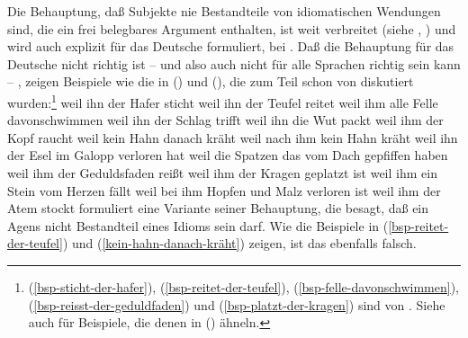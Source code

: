 Die Behauptung, daß Subjekte nie Bestandteile von idiomatischen Wendungen sind, die ein frei belegbares
Argument enthalten, ist weit verbreitet (siehe \zb {},
) und wird auch explizit für das Deutsche formuliert, \zb bei \citet[]{Grewendorf2002a}.
Daß die Behauptung für das Deutsche nicht richtig ist -- und also auch nicht für alle Sprachen richtig sein kann -- ,
zeigen Beispiele wie die in () und (), die zum Teil schon von \citet[]{Reis82} diskutiert
wurden:\footnote{
(\ref{bsp-sticht-der-hafer}), (\ref{bsp-reitet-der-teufel}), (\ref{bsp-felle-davonschwimmen}),
(\ref{bsp-reisst-der-geduldfaden}) und (\ref{bsp-platzt-der-kragen})
 sind von \citet[]{Reis82}. Siehe auch \citet[]{Haider93a} für Beispiele,
die denen in () ähneln.%
}
\eal
\ex\label{bsp-sticht-der-hafer}
weil ihn der Hafer sticht          %
\ex\label{bsp-reitet-der-teufel}
weil ihn der Teufel reitet         %
\ex\label{bsp-felle-davonschwimmen}
weil ihm alle Felle davonschwimmen %
\ex weil ihn der Schlag trifft     %
\ex\label{ex-ihn-die-wut-packt}
weil ihn die Wut packt         %
\ex weil ihm der Kopf raucht       %
\ex\label{kein-hahn-danach-kräht}
weil kein Hahn danach kräht    %
\ex 
weil nach ihm kein Hahn kräht                  %
\ex 
weil ihn der Esel im Galopp verloren hat   %
\ex\label{spatzen-gepfiffen}
weil die Spatzen das vom Dach gepfiffen haben  %
\zl
\eal
\ex\label{bsp-reisst-der-geduldfaden}
weil ihm der Geduldsfaden reißt
\ex\label{bsp-platzt-der-kragen}
weil ihm der Kragen geplatzt ist
\ex weil ihm ein Stein vom Herzen fällt
\ex weil bei ihm Hopfen und Malz verloren ist%
%
\ex weil ihm der Atem stockt
\zl
\citet[--209]{Marantz97a} formuliert eine Variante seiner Behauptung, die besagt, daß ein Agens 
nicht Bestandteil eines Idioms sein
darf. Wie die Beispiele in (\ref{bsp-reitet-der-teufel}) und (\ref{kein-hahn-danach-kräht})
zeigen, ist das ebenfalls falsch.

